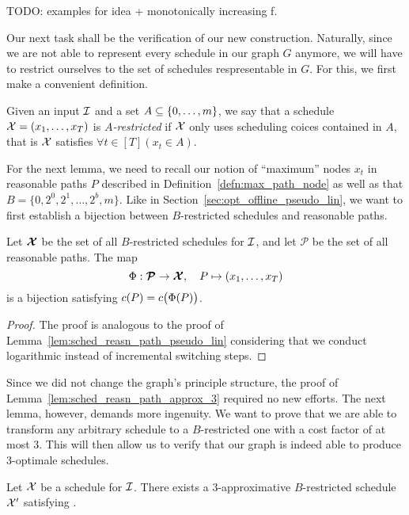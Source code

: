 TODO: examples for idea + monotonically increasing f.

Our next task shall be the verification of our new construction. Naturally, since we are not able to represent every schedule in our graph $G$ anymore, we will have to restrict ourselves to the set of schedules respresentable in $G$. For this, we first make a convenient definition.
\begin{defn}
Given an input $\mathcal{I}$ and a set $A\subseteq\{0,\ldots,m\}$, we say that a schedule $\mathcal{X}=(x_1,\ldots,x_T)$ is \textit{$A$-restricted} if $\mathcal{X}$ only uses scheduling coices contained in $A$, that is $\mathcal{X}$ satisfies $\forall t\in[T](x_t\in A)$.
\end{defn}
For the next lemma, we need to recall our notion of ``maximum'' nodes $x_t$ in reasonable paths $P$ described in Definition~\ref{defn:max_path_node} as well as that $B=\{0,2^0,2^1,\ldots,2^b,m\}$. Like in Section~\ref{sec:opt_offline_pseudo_lin}, we want to first establish a bijection between $B$-restricted schedules and reasonable paths.
\begin{lem}\label{lem:sched_reasn_path_approx_3}
Let $\bm{\mathcal{X}}$ be the set of all $B$-restricted schedules for $\mathcal{I}$, and let $\bm{\mathcal{P}}$ be the set of all reasonable paths. The map
\begin{equation*}
	\Phi:\bm{\mathcal{P}}\rightarrow\bm{\mathcal{X}},\quad P\mapsto (x_1,\ldots,x_T)
\end{equation*}
is a bijection satisfying $c(P)=c\bigl(\Phi(P)\bigr)$.
\end{lem}
\begin{proof}
The proof is analogous to the proof of Lemma~\ref{lem:sched_reasn_path_pseudo_lin} considering that we conduct logarithmic instead of incremental switching steps.
\end{proof}
Since we did not change the graph's principle structure, the proof of Lemma~\ref{lem:sched_reasn_path_approx_3} required no new efforts. The next lemma, however, demands more ingenuity. We want to prove that we are able to transform any arbitrary schedule to a $B$-restricted one with a cost factor of at most 3. This will then allow us to verify that our graph is indeed able to produce 3-optimale schedules.
\begin{lem}\label{lem:transform_schedule_approx_3}
Let $\mathcal{X}$ be a schedule for $\mathcal{I}$. There exists a 3-approximative $B$-restricted schedule $\mathcal{X}'$ satisfying .
\end{lem}
